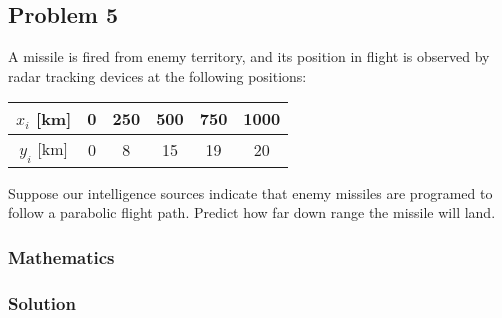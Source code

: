 \subsection{Problem 5}%
\label{sec:problem_5}
A missile is fired from enemy territory, and its position in flight is observed by radar
tracking devices at the following positions:
\begin{center}
  \begin{tabular}{|c|c|c|c|c|c|}
    \hline
    $x_i$ [km] & 0 & 250 & 500 & 750 & 1000 \\
    \hline
    $y_i$ [km] & 0 & 8 & 15 & 19 & 20 \\
    \hline
  \end{tabular}
\end{center}
Suppose our intelligence sources indicate that enemy missiles are programed to follow a
parabolic flight path. Predict how far down range the missile will land.
\subsubsection*{Mathematics}
\subsubsection*{Solution}
